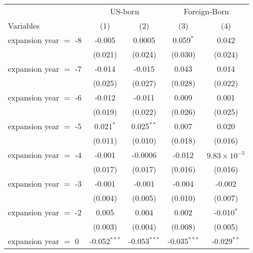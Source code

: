 \documentclass[
]{article}
\let\origtable\table
\let\endorigtable\endtable
\renewenvironment{table}[1][ht]{
      \expandafter\origtable\expandafter[H]
    }{
      \endorigtable
    }
\begin{document}
\begin{table}[htbp]
   \caption{The Impact of Medicaid Expansion on Uninsured Rate }
   \centering
   \small
   \renewcommand*{\arraystretch}{0.5}
   \begin{tabular}{lcccc}
      \tabularnewline \midrule \midrule
       & \multicolumn{2}{c}{US-born} & \multicolumn{2}{c}{Foreign-Born} \\ \cmidrule(lr){2-3} \cmidrule(lr){4-5}
      Variables             & (1)            & (2)            & (3)            & (4)\\  
      \midrule 
      expansion year $=$ -8 & -0.005         & 0.0005         & 0.059$^{*}$    & 0.042\\   
                            & (0.021)        & (0.024)        & (0.030)        & (0.024)\\   
      expansion year $=$ -7 & -0.014         & -0.015         & 0.043          & 0.014\\   
                            & (0.025)        & (0.027)        & (0.028)        & (0.022)\\   
      expansion year $=$ -6 & -0.012         & -0.011         & 0.009          & 0.001\\   
                            & (0.019)        & (0.022)        & (0.026)        & (0.025)\\   
      expansion year $=$ -5 & 0.021$^{*}$    & 0.025$^{**}$   & 0.007          & 0.020\\   
                            & (0.011)        & (0.010)        & (0.018)        & (0.016)\\   
      expansion year $=$ -4 & -0.001         & -0.0006        & -0.012         & $9.83\times 10^{-5}$\\    
                            & (0.017)        & (0.017)        & (0.016)        & (0.016)\\   
      expansion year $=$ -3 & -0.001         & -0.001         & -0.004         & -0.002\\   
                            & (0.004)        & (0.005)        & (0.010)        & (0.007)\\   
      expansion year $=$ -2 & 0.005          & 0.004          & 0.002          & -0.010$^{*}$\\   
                            & (0.003)        & (0.004)        & (0.008)        & (0.005)\\   
      expansion year $=$ 0  & -0.052$^{***}$ & -0.053$^{***}$ & -0.035$^{***}$ & -0.029$^{**}$\\   

\end{tabular}
\end{table}
\end{document}
